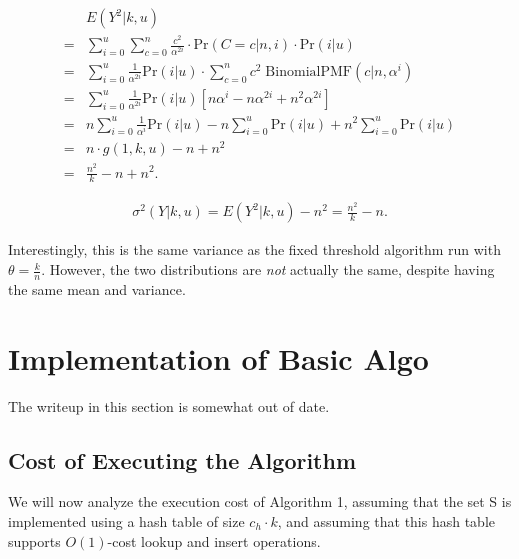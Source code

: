 \documentclass{sig-alternate}
\begin{document}
\begin{align}
  & E(Y^2|k,u)  \\
= &    \sum_{i=0}^u    \sum_{c=0}^{n}    \frac{c^2}{\alpha^{2i}}   \cdot \mathrm{Pr}(C = c|n,i)   \cdot \mathrm{Pr}(i|u) \\
= &    \sum_{i=0}^u  \frac{1}{\alpha^{2i}}  \mathrm{Pr}(i|u)  \cdot \sum_{c=0}^{n} c^2 \; \mathrm{BinomialPMF}(c|n,\alpha^i) \\     %
= &    \sum_{i=0}^u  \frac{1}{\alpha^{2i}}  \mathrm{Pr}(i|u)  \left[ n \alpha^i - n \alpha^{2i} + n^2 \alpha^{2i} \right] \\
= &  n \sum_{i=0}^u  \frac{1}{\alpha^{i}} \mathrm{Pr}(i|u) - n \sum_{i=0}^u \mathrm{Pr}(i|u) + n^2 \sum_{i=0}^u \mathrm{Pr}(i|u) \\
= & n \cdot g(1,k,u) - n + n^2 \\
= & \frac{n^2}{k} - n + n^2.
\end{align}

\begin{align}
 \sigma^2(Y|k,u) = E(Y^2|k,u) - n^2 = \frac{n^2}{k} - n.
\end{align}

Interestingly, this is the same variance as the fixed threshold algorithm run with $\theta = \frac{k}{n}$.
However, the two distributions are {\em not} actually the same, despite having the same mean and variance.


\section{Implementation of Basic Algo}

The writeup in this section is somewhat out of date.

\subsection{Cost of Executing the Algorithm}

We will now analyze the execution cost of Algorithm 1, assuming that the
set S is implemented using a hash table of size $c_h \cdot k$, and
assuming that this hash table supports $O(1)$-cost lookup and insert operations.
\end{document}
